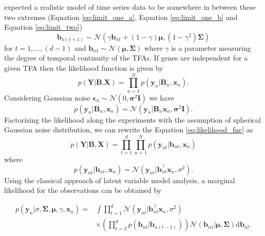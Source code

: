 \cite{Sanguinetti:2006} expected a realistic model of time series data to be somewhere in between these two extremes (Equation \ref{eq:limit_one_a}, Equation \ref{eq:limit_one_b} and Equation \ref{eq:limit_two})
\begin{equation} \label{eq:tfa_SanG_update}
  \textbf{b}_{n(t+1)} \sim \mathcal{N} (\gamma \textbf{b}_{nt} + (1-\gamma)\boldsymbol{\mu},(1-\gamma^2)\boldsymbol{\Sigma})
\end{equation}
for $ t= 1, ... , (d-1)$ and $ \textbf{b}_{n1} \sim \mathcal{N} ( \boldsymbol{\mu},\boldsymbol{\Sigma})$
where $\gamma$ is a parameter measuring the degree of temporal continuity of the TFAs. If genes are independent for a given TFA then the likelihood function is given by
\begin{equation} \label{eq:likelihood_fnc}
  p\left(\textbf{Y}|\textbf{B,X}\right)= \prod_{n \mathop = 1}^{N} p\left(\textbf{y}_n|\textbf{B}_n,\textbf{x}_n\right).
\end{equation}
Considering Gaussian noise $\boldsymbol{\epsilon}_n \sim \mathcal{N} \left(0,\boldsymbol{\sigma}^2\textbf{I}\right)$ we have
\begin{equation} \label{eq:likelihood_fnc_SingleGene}
  p\left(\textbf{y}_n|\textbf{B}_n,\textbf{x}_n\right)= \mathcal{N} \left(\textbf{y}_n|\textbf{B}_n \textbf{x}_n, \boldsymbol{\sigma}^2\textbf{I} \right).
\end{equation}
Factorizing the likelihood along the experiments with the assumption of spherical Gaussian noise distribution, we can rewrite the Equation \ref{eq:likelihood_fnc} as
\begin{equation} \label{eq:likelihood_factorize}
  p\left(\textbf{Y}|\textbf{B},\textbf{X}\right)= 
     \prod_{t \mathop = 1}^{d} \prod_{n \mathop = 1}^{N} p\left(\textbf{y}_{nt}|\textbf{b}_{nt},\textbf{x}_n\right)
\end{equation}
where
\begin{equation} \label{eq:likelihood_fnc_allGene}
  p\left(\textbf{y}_{nt}|\textbf{b}_{nt},\textbf{x}_n\right)= \mathcal{N} \left(\textbf{y}_{nt}|\textbf{b}^\top_{nt}\textbf{x}_n,\sigma^2 \right).
\end{equation}
Using the classical approach of latent variable model analysis, a marginal likelihood for the observations can be obtained by

\begin{equation} \label{eq:marginal_likelihood_tfa}
\begin{aligned}
p\left(\textbf{y}_n|\sigma,\boldsymbol{\Sigma},\boldsymbol{\mu},\gamma,\textbf{x}_n\right) = &
\int \prod^{d}_{t=1} \mathcal{N} \left(\textbf{y}_{nt}|\textbf{b}^\top_{nt}\textbf{x}_n, \sigma^2 \right)\\
& \times \left( \prod^{d}_{t=2} p\left(\textbf{b}_{nt}|\textbf{b}_{n(t-1)}\right) \right)
\mathcal{N} \left(\textbf{b}_{n1}|\boldsymbol{\mu},\boldsymbol{\Sigma} \right)\text{d}\textbf{b}_{nt}.
\end{aligned}
\end{equation}

